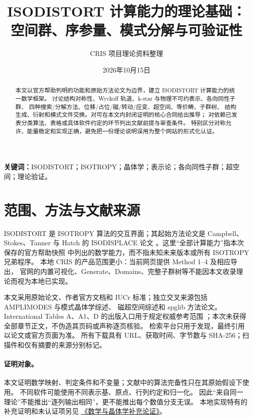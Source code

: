 
\title{ISODISTORT 计算能力的理论基础：\\空间群、序参量、模式分解与可验证性}
\author{CRIS 项目理论资料整理}
\date{2026年10月15日}

\maketitle
\begin{abstract}
本文以官方帮助列明的功能和原始方法论文为边界，建立 ISODISTORT 计算能力的统一数学框架。
讨论结构对称性、Wyckoff 轨道、k-star 与物理不可约表示、各向同性子群、
四种搜索/分解方法、位移/占位/磁/转动/应变、超空间、等价畴、子群树、
结构生成、衍射和模式文件交换。对可在本文内封闭证明的核心合同给出推导；
对依赖已发表分类算法、表格或具体软件约定的环节列出文献前提与审查条件。
特别区分对称允许、能量稳定和实现正确，避免把一份理论说明误用为整个网站的形式化认证。
\end{abstract}
\noindent\textbf{关键词：}ISODISTORT；ISOTROPY；晶体学；表示论；各向同性子群；超空间；理论验证。
\par\scope
\clearpage
{\small\tableofcontents}
\clearpage

\section{范围、方法与文献来源}\label{sec:scope}
ISODISTORT 是 ISOTROPY 算法的交互界面；其起始方法论文是
Campbell、Stokes、Tanner 与 Hatch 的 ISODISPLACE 论文
\citep{Campbell2006}。这里“全部计算能力”指本次保存的官方帮助快照
\citep{OfficialHelp} 中列出的数学能力，而不指未知未来版本或所有 ISOTROPY 兄弟程序。
本地 CRIS 的产品范围更小：当前网页提供 Method 1--4 及相应导出，
官网的内置可视化、Generate、Domains、完整子群树等不能因本文收录理论而视为本地已实现。

本文采用原始论文、作者官方文档和 IUCr 标准；独立交叉来源包括
AMPLIMODES 与模式晶体学综述\citep{Amplimodes2009,PerezMato2010}、
磁超空间综述\citep{Magnetic2012}和 spglib 方法论文\citep{Spglib2024}。
International Tables A、A1、D 的出版入口用于规定权威参考范围
\citep{ITA,ITA1,ITD}；本次未获得全部章节正文，不伪造其页码或声称逐页核验。
检索平台只用于发现，最终引用以论文或官方页面为准。
所有下载具有 URL、获取时间、字节数与 SHA-256；扫描件和仅有摘要的来源分别标记。

\paragraph{证明对象。}
本文证明数学映射、判定条件和不变量；文献中的算法完备性只在其原始假设下使用。
不同软件可能使用不同表示基、原点、行列约定和归一化。
因此“来自同一理论”不能推出“逐列输出相同”，更不能推出每个数值分支无误。
本地实现特有的补充证明和未认证项另见
\href{unsupported_algorithm_proofs.pdf}{《数学与晶体学补充论证》}。


